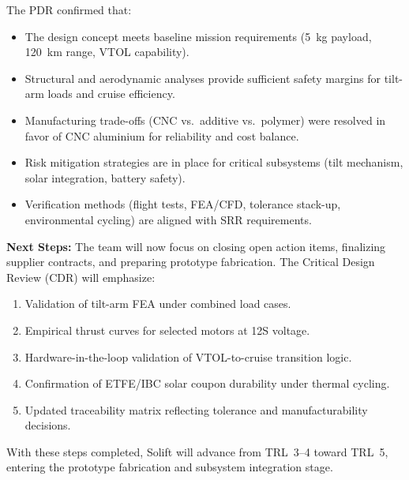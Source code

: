 \noindent The PDR confirmed that:
\begin{itemize}[noitemsep]
    \item The design concept meets baseline mission requirements (5~kg payload, 120~km range, VTOL capability).
    \item Structural and aerodynamic analyses provide sufficient safety margins for tilt-arm loads and cruise efficiency.
    \item Manufacturing trade-offs (CNC vs.\ additive vs.\ polymer) were resolved in favor of CNC aluminium for reliability and cost balance.
    \item Risk mitigation strategies are in place for critical subsystems (tilt mechanism, solar integration, battery safety).
    \item Verification methods (flight tests, FEA/CFD, tolerance stack-up, environmental cycling) are aligned with SRR requirements.
\end{itemize}

\noindent \textbf{Next Steps:}  
The team will now focus on closing open action items, finalizing supplier contracts, and preparing prototype fabrication. The Critical Design Review (CDR) will emphasize:
\begin{enumerate}[noitemsep]
    \item Validation of tilt-arm FEA under combined load cases.
    \item Empirical thrust curves for selected motors at 12S voltage.
    \item Hardware-in-the-loop validation of VTOL-to-cruise transition logic.
    \item Confirmation of ETFE/IBC solar coupon durability under thermal cycling.
    \item Updated traceability matrix reflecting tolerance and manufacturability decisions.
\end{enumerate}

\noindent With these steps completed, Solift will advance from TRL~3--4 toward TRL~5, entering the prototype fabrication and subsystem integration stage.
